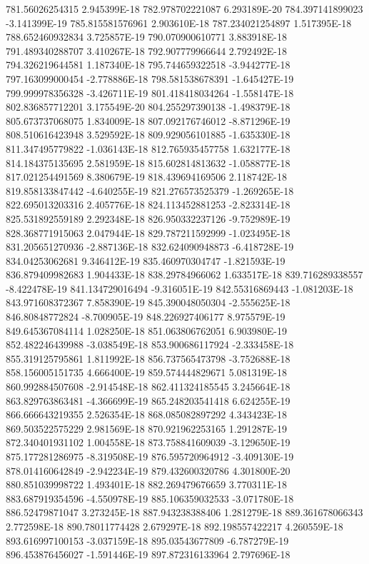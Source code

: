 781.56026254315  2.945399E-18
782.978702221087  6.293189E-20
784.397141899023  -3.141399E-19
785.815581576961  2.903610E-18
787.234021254897  1.517395E-18
788.652460932834  3.725857E-19
790.070900610771  3.883918E-18
791.489340288707  3.410267E-18
792.907779966644  2.792492E-18
794.326219644581  1.187340E-18
795.744659322518  -3.944277E-18
797.163099000454  -2.778886E-18
798.581538678391  -1.645427E-19
799.999978356328  -3.426711E-19
801.418418034264  -1.558147E-18
802.836857712201  3.175549E-20
804.255297390138  -1.498379E-18
805.673737068075  1.834009E-18
807.092176746012  -8.871296E-19
808.510616423948  3.529592E-18
809.929056101885  -1.635330E-18
811.347495779822  -1.036143E-18
812.765935457758  1.632177E-18
814.184375135695  2.581959E-18
815.602814813632  -1.058877E-18
817.021254491569  8.380679E-19
818.439694169506  2.118742E-18
819.858133847442  -4.640255E-19
821.276573525379  -1.269265E-18
822.695013203316  2.405776E-18
824.113452881253  -2.823314E-18
825.531892559189  2.292348E-18
826.950332237126  -9.752989E-19
828.368771915063  2.047944E-18
829.787211592999  -1.023495E-18
831.205651270936  -2.887136E-18
832.624090948873  -6.418728E-19
834.04253062681  9.346412E-19
835.460970304747  -1.821593E-19
836.879409982683  1.904433E-18
838.29784966062  1.633517E-18
839.716289338557  -8.422478E-19
841.134729016494  -9.316051E-19
842.55316869443  -1.081203E-18
843.971608372367  7.858390E-19
845.390048050304  -2.555625E-18
846.80848772824  -8.700905E-19
848.226927406177  8.975579E-19
849.645367084114  1.028250E-18
851.063806762051  6.903980E-19
852.482246439988  -3.038549E-18
853.900686117924  -2.333458E-18
855.319125795861  1.811992E-18
856.737565473798  -3.752688E-18
858.156005151735  4.666400E-19
859.574444829671  5.081319E-18
860.992884507608  -2.914548E-18
862.411324185545  3.245664E-18
863.829763863481  -4.366699E-19
865.248203541418  6.624255E-19
866.666643219355  2.526354E-18
868.085082897292  4.343423E-18
869.503522575229  2.981569E-18
870.921962253165  1.291287E-19
872.340401931102  1.004558E-18
873.758841609039  -3.129650E-19
875.177281286975  -8.319508E-19
876.595720964912  -3.409130E-19
878.014160642849  -2.942234E-19
879.432600320786  4.301800E-20
880.851039998722  1.493401E-18
882.269479676659  3.770311E-18
883.687919354596  -4.550978E-19
885.106359032533  -3.071780E-18
886.52479871047  3.273245E-18
887.943238388406  1.281279E-18
889.361678066343  2.772598E-18
890.78011774428  2.679297E-18
892.198557422217  4.260559E-18
893.616997100153  -3.037159E-18
895.03543677809  -6.787279E-19
896.453876456027  -1.591446E-19
897.872316133964  2.797696E-18
